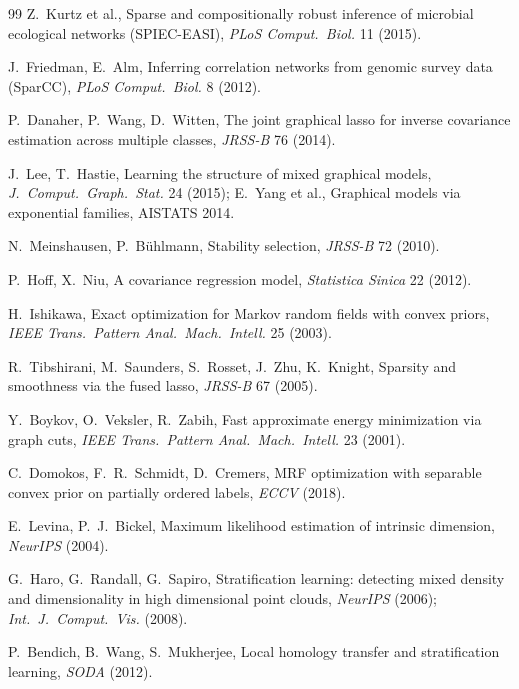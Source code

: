 \documentclass[11pt]{article}
\theoremstyle{definition}
\theoremstyle{plain}
\theoremstyle{remark}
\newcommand{\1}{\mathbf{1}}
\begin{document}
\begin{thebibliography}{99}
 Z.~Kurtz et al.,
  Sparse and compositionally robust inference of microbial ecological networks
  (SPIEC-EASI), \emph{PLoS Comput.\ Biol.} 11 (2015).

 J.~Friedman, E.~Alm,
  Inferring correlation networks from genomic survey data (SparCC),
  \emph{PLoS Comput.\ Biol.} 8 (2012).

 P.~Danaher, P.~Wang, D.~Witten,
  The joint graphical lasso for inverse covariance estimation across multiple
  classes, \emph{JRSS-B} 76 (2014).

 J.~Lee, T.~Hastie,
  Learning the structure of mixed graphical models,
  \emph{J.\ Comput.\ Graph.\ Stat.} 24 (2015);
  E.~Yang et al., Graphical models via exponential families, AISTATS 2014.

 N.~Meinshausen, P.~B\"uhlmann,
  Stability selection, \emph{JRSS-B} 72 (2010).

 P.~Hoff, X.~Niu,
  A covariance regression model, \emph{Statistica Sinica} 22 (2012).

 H.~Ishikawa,
  Exact optimization for Markov random fields with convex priors,
  \emph{IEEE Trans.\ Pattern Anal.\ Mach.\ Intell.} 25 (2003).

 R.~Tibshirani, M.~Saunders, S.~Rosset, J.~Zhu, K.~Knight,
  Sparsity and smoothness via the fused lasso, \emph{JRSS-B} 67 (2005).

 Y.~Boykov, O.~Veksler, R.~Zabih,
  Fast approximate energy minimization via graph cuts,
  \emph{IEEE Trans.\ Pattern Anal.\ Mach.\ Intell.} 23 (2001).

 C.~Domokos, F.~R.~Schmidt, D.~Cremers,
  MRF optimization with separable convex prior on partially ordered labels,
  \emph{ECCV} (2018).

 E.~Levina, P.~J.~Bickel,
  Maximum likelihood estimation of intrinsic dimension,
  \emph{NeurIPS} (2004).

 G.~Haro, G.~Randall, G.~Sapiro,
  Stratification learning: detecting mixed density and dimensionality in high
  dimensional point clouds, \emph{NeurIPS} (2006); \emph{Int.\ J.\ Comput.\ Vis.}
  (2008).

 P.~Bendich, B.~Wang, S.~Mukherjee,
  Local homology transfer and stratification learning, \emph{SODA} (2012).

\end{thebibliography}
\end{document}
